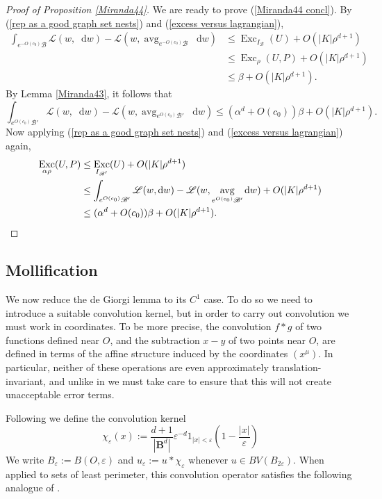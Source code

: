 \documentclass[reqno,11pt]{amsart}
\newcommand{\Ball}{\mathbf{B}}
\DeclareMathOperator{\avg}{avg}
\DeclareMathOperator{\Exc}{Exc}
\newcommand*\dif{\mathop{}\!\mathrm{d}}
\newcommand{\Lagrange}{\mathscr L}
\theoremstyle{definition}
\numberwithin{equation}{section}
\begin{document}
\begin{proof}[Proof of Proposition \ref{Miranda44}]
We are ready to prove (\ref{Miranda44 concl}).
By (\ref{rep as a good graph set nests}) and (\ref{excess versus lagrangian}),
\begin{align*}
\int_{e^{-O(c_0)} \mathscr B} \Lagrange(w, \dif w) - \Lagrange(w, \avg_{e^{-O(c_0)} \mathscr B} \dif w)
&\leq \Exc_{I_{\mathscr B}}(U) + O(|K| \rho^{d + 1}) \\
&\leq \Exc_\rho(U, P) + O(|K| \rho^{d + 1}) \\
&\leq \beta + O(|K| \rho^{d + 1}).
\end{align*}
By Lemma \ref{Miranda43}, it follows that
$$\int_{e^{O(c_0)} \mathscr B'} \Lagrange(w, \dif w) - \Lagrange(w, \avg_{e^{O(c_0)} \mathscr B'} \dif w) \leq (\alpha^d + O(c_0)) \beta + O(|K| \rho^{d + 1}).$$
Now applying (\ref{rep as a good graph set nests}) and (\ref{excess versus lagrangian}) again,
\begin{align*}
\Exc_{\alpha \rho}(U, P)
&\leq \Exc_{I_{\mathscr B'}}(U) + O(|K| \rho^{d + 1}) \\
&\leq \int_{e^{O(c_0)} \mathscr B'} \Lagrange(w, \dif w) - \Lagrange(w, \avg_{e^{O(c_0)} \mathscr B'} \dif w) + O(|K| \rho^{d + 1}) \\
&\leq (\alpha^d + O(c_0)) \beta + O(|K| \rho^{d + 1}). \qedhere
\end{align*}
\end{proof}

\subsection{Mollification}
We now reduce the de Giorgi lemma to its $C^1$ case.
To do so we need to introduce a suitable convolution kernel, but in order to carry out convolution we must work in coordinates.
To be more precise, the convolution $f * g$ of two functions defined near $O$, and the subtraction $x - y$ of two points near $O$, are defined in terms of the affine structure induced by the coordinates $(x^\mu)$.
In particular, neither of these operations are even approximately translation-invariant, and unlike in \cite{Giusti77} we must take care to ensure that this will not create unacceptable error terms.

Following \cite[Chapter 7]{Giusti77} we define the convolution kernel
$$\chi_\varepsilon(x) := \frac{d + 1}{|\Ball^d|} \varepsilon^{-d}1_{|x| < \varepsilon} \left(1 - \frac{|x|}{\varepsilon}\right)$$
We write $B_\varepsilon := B(O, \varepsilon)$ and $u_\varepsilon := u * \chi_\varepsilon$ whenever $u \in BV(B_{2\varepsilon})$.
When applied to sets of least perimeter, this convolution operator satisfies the following analogue of \cite[Theorem 7.3]{Giusti77}.
\end{document}
